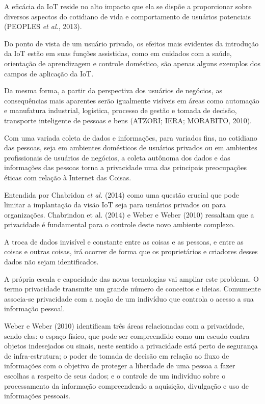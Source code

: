 A eficácia da IoT reside no alto impacto que ela se dispõe a proporcionar sobre diversos aspectos do cotidiano de vida e comportamento de usuários potenciais (PEOPLES \textit{et al.}, 2013).

Do ponto de vista de um usuário privado, os efeitos mais evidentes da introdução da IoT estão em suas funções assistidas, como em cuidados com a saúde, orientação de aprendizagem e controle doméstico, são apenas alguns exemplos dos campos de aplicação da IoT.

Da mesma forma, a partir da perspectiva dos usuários de negócios, as consequências mais aparentes serão igualmente visíveis em áreas como automação e manufatura industrial, logística, processo de gestão e tomada de decisão, transporte inteligente de pessoas e bens (ATZORI; IERA; MORABITO, 2010).

Com uma variada coleta de dados e informações, para variados fins, no cotidiano das pessoas, seja em ambientes domésticos de usuários privados ou em ambientes profissionais de usuários de negócios, a coleta autônoma dos dados e das informações das pessoas torna a privacidade uma das principais preocupações éticas com relação à Internet das Coisas.

Entendida por Chabridon \textit{et al.} (2014) como uma questão crucial que pode limitar a implantação da visão IoT seja para usuários privados ou para organizações. Chabrindon et al. (2014) e Weber e Weber (2010) ressaltam que a privacidade é fundamental para o controle deste novo ambiente complexo.

A troca de dados invisível e constante entre as coisas e as pessoas, e entre as coisas e outras coisas, irá ocorrer de forma que os proprietários e criadores desses dados não sejam identificados.

A própria escala e capacidade das novas tecnologias vai ampliar este problema. O termo privacidade transmite um grande número de conceitos e ideias. Comumente associa-se privacidade com a noção de um indivíduo que controla o acesso a sua informação pessoal.

Weber e Weber (2010) identificam três áreas relacionadas com a privacidade, sendo elas: o espaço físico, que pode ser compreendido como um escudo contra objetos indesejados ou sinais, neste sentido a privacidade está perto de segurança de infra-estrutura; o poder de tomada de decisão em relação ao fluxo de informações com o objetivo de proteger a liberdade de uma pessoa a fazer escolhas a respeito de seus dados; e o controle de um indivíduo sobre o processamento da informação compreendendo a aquisição, divulgação e uso de informações pessoais.

